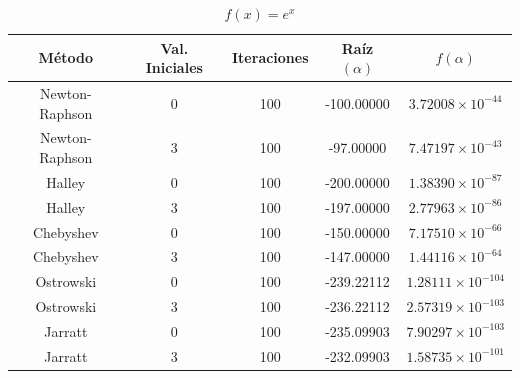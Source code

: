 \begin{table}[H]
\centering

\renewcommand{\arraystretch}{1.3} %
\setlength{\tabcolsep}{12pt}      %

\begin{tabular}{ccccc}
\hline
Método & Val. Iniciales & Iteraciones & Raíz $(\alpha)$ & $f(\alpha)$ \\
\hline

Newton-Raphson & 0 & 100 & -100.00000 & $3.72008\times10^{-44}$ \\

Newton-Raphson & 3 & 100 & -97.00000  & $7.47197\times10^{-43}$ \\

Halley         & 0 & 100 & -200.00000 & $1.38390\times10^{-87}$ \\

Halley         & 3 & 100 & -197.00000 & $2.77963\times10^{-86}$ \\

Chebyshev      & 0 & 100 & -150.00000 & $7.17510\times10^{-66}$ \\

Chebyshev      & 3 & 100 & -147.00000 & $1.44116\times10^{-64}$ \\

Ostrowski      & 0 & 100 & -239.22112 & $1.28111\times10^{-104}$ \\

Ostrowski      & 3 & 100 & -236.22112 & $2.57319\times10^{-103}$ \\

Jarratt        & 0 & 100 & -235.09903 & $7.90297\times10^{-103}$ \\

Jarratt        & 3 & 100 & -232.09903 & $1.58735\times10^{-101}$ \\

\hline
\end{tabular}

\caption{$f(x) = e^{x}$}
\end{table}


